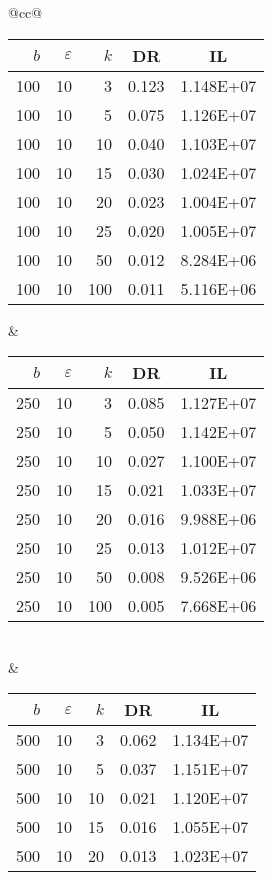 \begin{table}[H]
	\centering
	\begin{tabular}{@{}cc@{}}
		\begin{tabular}{@{}rrrrr@{}}
			\toprule
			$b$ & $\varepsilon$ & $k$ & \multicolumn{1}{c}{DR} & \multicolumn{1}{c}{IL} \\ \midrule
			100	&	10	&	3	&	0.123	&	1.148E+07 \\
			100	&	10	&	5	&	0.075	&	1.126E+07 \\
			100	&	10	&	10	&	0.040	&	1.103E+07 \\
			100	&	10	&	15	&	0.030	&	1.024E+07 \\
			100	&	10	&	20	&	0.023	&	1.004E+07 \\
			100	&	10	&	25	&	0.020	&	1.005E+07 \\
			100	&	10	&	50	&	0.012	&	8.284E+06 \\
			100	&	10	&	100	&	0.011	&	5.116E+06 \\
		\end{tabular}
		&
		\begin{tabular}{@{}rrrrr@{}}
			\toprule
			$b$ & $\varepsilon$ & $k$ & \multicolumn{1}{c}{DR} & \multicolumn{1}{c}{IL} \\ \midrule
			250	&	10	&	3	&	0.085	&	1.127E+07 \\
			250	&	10	&	5	&	0.050	&	1.142E+07 \\
			250	&	10	&	10	&	0.027	&	1.100E+07 \\
			250	&	10	&	15	&	0.021	&	1.033E+07 \\
			250	&	10	&	20	&	0.016	&	9.988E+06 \\
			250	&	10	&	25	&	0.013	&	1.012E+07 \\
			250	&	10	&	50	&	0.008	&	9.526E+06 \\
			250	&	10	&	100	&	0.005	&	7.668E+06 \\
		\end{tabular}
		\\ & \\
		\begin{tabular}{@{}rrrrr@{}}
			\toprule
			$b$ & $\varepsilon$ & $k$ & \multicolumn{1}{c}{DR} & \multicolumn{1}{c}{IL} \\ \midrule
			500	&	10	&	3	&	0.062	&	1.134E+07 \\
			500	&	10	&	5	&	0.037	&	1.151E+07 \\
			500	&	10	&	10	&	0.021	&	1.120E+07 \\
			500	&	10	&	15	&	0.016	&	1.055E+07 \\
			500	&	10	&	20	&	0.013	&	1.023E+07 \\

\end{tabular}
\end{tabular}
\end{table}
